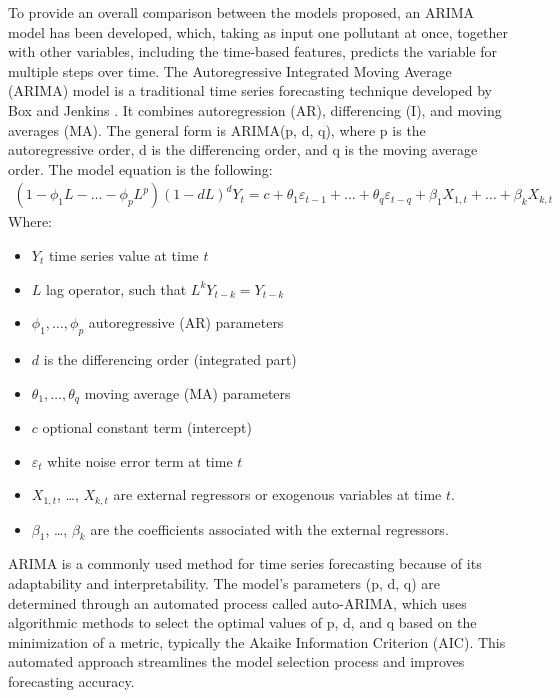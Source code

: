 To provide an overall comparison between the models proposed, an ARIMA model has been developed, which, taking as input one pollutant at once, together with other variables, including the time-based features, predicts the variable for multiple steps over time. 
The Autoregressive Integrated Moving Average (ARIMA) model is a traditional time series forecasting technique developed by Box and Jenkins \cite{box1970time}. It combines autoregression (AR), differencing (I), and moving averages (MA). The general form is ARIMA(p, d, q), where p is the autoregressive order, d is the differencing order, and q is the moving average order. The model equation is the following:
\begin{align*}
(1 - \phi_1 L - \dots - \phi_p L^p)(1 - dL)^d Y_t = c + \theta_1 \varepsilon_{t-1} + \dots + \theta_q \varepsilon_{t-q} + \beta_1 X_{1,t} + \dots + \beta_k X_{k,t}
\end{align*}
Where: 
\begin{itemize}[leftmargin=*, noitemsep]
    \item[] $Y_t$ time series value at time $t$
    \item[] $L$ lag operator, such that $L^k Y_{t-k} = Y_{t-k}$ 
    \item[] $\phi_1, \dots ,  \phi_p$ autoregressive (AR) parameters
    \item[] $d$ is the differencing order (integrated part)
    \item[] $\theta_1, \dots , \theta_q$ moving average (MA) parameters
    \item[] $c$ optional constant term (intercept)
    \item[] $\varepsilon_t$ white noise error term at time $t$
    \item[] $X_{1,t}$, \dots, $X_{k,t}$ are external regressors or exogenous variables at time $t$. 
    \item[] $\beta_1$, \dots, $\beta_k$ are the coefficients associated with the external regressors.
\end{itemize}



ARIMA is a commonly used method for time series forecasting because of its adaptability and interpretability. The model's parameters (p, d, q) are determined through an automated process called auto-ARIMA, which uses algorithmic methods to select the optimal values of p, d, and q based on the minimization of a metric, typically the Akaike Information Criterion (AIC). This automated approach streamlines the model selection process and improves forecasting accuracy.

